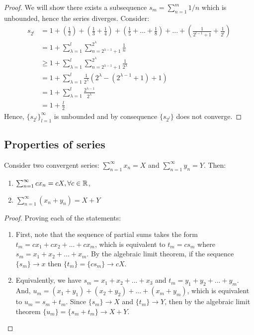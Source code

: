 \begin{proof}
    We will show there exists a subsequence $s_m = \sum_{n=1}^m 1/n$ which is unbounded, hence the series diverges. Consider:
    \begin{align*}
        s_{2^l} &= 1 + \left( \frac{1}{2}\right) + \left( \frac{1}{3} + \frac{1}{4}\right) +
        \left( \frac{1}{5} + ... + \frac{1}{8}\right) + ... +
        \left( \frac{1}{2^{l-1}+1} + \frac{1}{2^l}\right) \\
        &= 1 + \sum \limits_{\lambda = 1}^l \sum \limits_{n=2^{\lambda - 1} + 1}^{2^\lambda} \frac{1}{n}  \\
        &\geq 1 + \sum \limits_{\lambda = 1}^l \sum \limits_{n=2^{\lambda - 1} + 1}^{2^\lambda} \frac{1}{2^\lambda}  \\
        &= 1 + \sum \limits_{\lambda = 1}^l \frac{1}{2^\lambda}(2^\lambda - (2^{\lambda-1}+ 1) + 1) \\
        &= 1 + \sum \limits_{\lambda = 1}^l \frac{2^{\lambda-1}}{2^\lambda} \\
        &= 1 + \frac{l}{2}
    \end{align*}
    Hence, $\{s_{2^l}\}_{l=1}^\infty$ is unbounded and by consequence $\{ s_{2^l}\}$ does not converge.
\end{proof}

\subsection{Properties of series}

\begin{theorem}
    Consider two convergent series: $\sum_{n=1}^\infty x_n = X$ and $\sum_{n=1}^\infty y_n = Y$. Then:
    \begin{enumerate}
        \item $\sum_{n=1}^\infty cx_n = cX, \forall c \in \mathbb{R}$,
        \item $\sum_{n=1}^\infty (x_n + y_n) = X + Y$
    \end{enumerate}
\end{theorem}

\begin{proof}
    Proving each of the statements:
    \begin{enumerate}
        \item First, note that the sequence of partial sums takes the form $t_m = c x_1 + c x_2 + ... + c x_m$, which is equivalent to $t_m = c s_m$ where $s_m = x_1 + x_2 + ... + x_m$. By the algebraic limit theorem, if the sequence $\{s_m\} \to x$ then $\{t_m\} = \{c s_m\} \to c X$.
        \item Equivalently, we have $s_m = x_1 + x_2 + ... + x_3$ and $t_m = y_1 + y_2 + ... + y_m$. And, $u_m = (x_1+y_1) + (x_2+y_2) + ... + (x_m+y_m) $, which is equivalent to $u_m = s_m + t_m$. Since $\{s_m\} \to X$ and $\{t_m\} \to Y$, then by the algebraic limit theorem $\{u_m\} = \{s_m + t_m\} \to X + Y$.
    \end{enumerate}
\end{proof}

